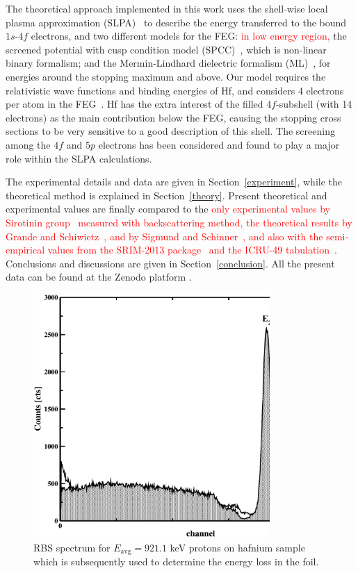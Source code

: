\documentclass[aps,pra,reprint,superscriptaddress]{revtex4-1}
\def\clau#1{\textcolor{red}{#1}}
\begin{document}
The theoretical approach implemented in this work uses the shell-wise local plasma approximation (SLPA)~\cite{mon13} to describe the energy 
transferred to the bound $1s$-$4f$ electrons, and two different models 
for the FEG: \clau{in low energy region,}
the screened potential with cusp condition model (SPCC)~\cite{mon17}, 
which is non-linear binary formalism; and the Mermin-Lindhard dielectric 
formalism (ML)~\cite{Mermin}, for energies around the stopping maximum 
and above. Our model requires the relativistic wave functions and 
binding energies of Hf, and considers 4 electrons per atom in the 
FEG~\cite{mendez2019}. Hf has the extra interest of the filled 
$4f$-subshell (with 14 electrons) as the main contribution below the 
FEG, causing the stopping cross sections to be very sensitive to a good 
description of this shell. The screening among the $4f$ and $5p$ 
electrons has been considered and found to play a major role within the 
SLPA calculations.

The experimental details and data are given in Section~\ref{experiment}, 
while the theoretical method is explained in Section~\ref{theory}. 
Present theoretical and experimental values are finally compared to the \clau{only experimental values by Sirotinin group~\cite{Sirotinin} measured with backscattering method, the theoretical results by  Grande and Schiwietz~\cite{Grande,casp52}, and by Sigmund and Schinner~\cite{DPASS20}, and also with the semi-empirical values from the SRIM-2013 package~\cite{Ziegler01} and the ICRU-49 tabulation~\cite{ICRU49}}. 
Conclusions and discussions are given in Section~\ref{conclusion}. All 
the present data can be found at the Zenodo platform \cite{zenodo}.

\begin{figure}[!t]
\centering
\includegraphics[width=9cm]{Fig01.eps}
\caption{RBS spectrum for $E_{\mathrm{avg}}=921.1$ keV protons on 
hafnium sample which is subsequently used to determine the energy loss 
in the foil.}
\label{F01}
\end{figure}
\end{document}
